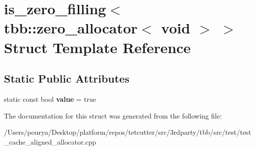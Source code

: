 \hypertarget{structis__zero__filling_3_01tbb_1_1zero__allocator_3_01void_01_4_01_4}{}\section{is\+\_\+zero\+\_\+filling$<$ tbb\+:\+:zero\+\_\+allocator$<$ void $>$ $>$ Struct Template Reference}
\label{structis__zero__filling_3_01tbb_1_1zero__allocator_3_01void_01_4_01_4}
\subsection*{Static Public Attributes}
\begin{DoxyCompactItemize}
\item 
\hypertarget{structis__zero__filling_3_01tbb_1_1zero__allocator_3_01void_01_4_01_4_a30dce3a378fbb49f2c23ca4fc42bac8d}{}static const bool {\bfseries value} = true\label{structis__zero__filling_3_01tbb_1_1zero__allocator_3_01void_01_4_01_4_a30dce3a378fbb49f2c23ca4fc42bac8d}

\end{DoxyCompactItemize}


The documentation for this struct was generated from the following file\+:\begin{DoxyCompactItemize}
\item 
/\+Users/pourya/\+Desktop/platform/repos/tetcutter/src/3rdparty/tbb/src/test/test\+\_\+cache\+\_\+aligned\+\_\+allocator.\+cpp\end{DoxyCompactItemize}
